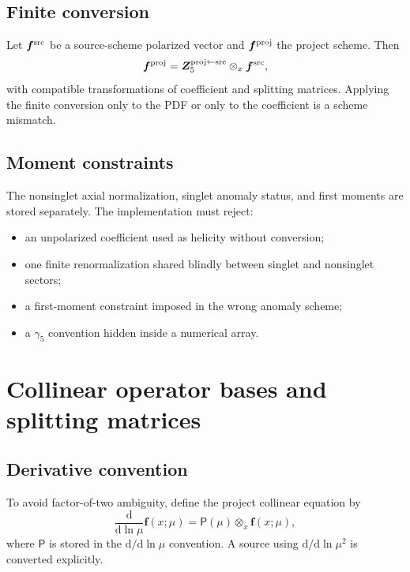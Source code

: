 \documentclass[11pt]{article}
\newcommand{\dd}{\mathrm{d}}
\newcommand{\otimesx}{\mathbin{\otimes_x}}
\begin{document}
\subsection{Finite conversion}

Let \(\bm f^{\rm src}\) be a source-scheme polarized vector and \(\bm f^{\rm proj}\) the project scheme.  Then
\begin{equation}
 \bm f^{\rm proj}
 =
 \bm Z_5^{\rm proj\leftarrow src}
 \otimesx
 \bm f^{\rm src},
 \label{eq:gamma5-conversion}
\end{equation}
with compatible transformations of coefficient and splitting matrices.  Applying the finite conversion only to the PDF or only to the coefficient is a scheme mismatch.

\subsection{Moment constraints}

The nonsinglet axial normalization, singlet anomaly status, and first moments are stored separately.  The implementation must reject:
\begin{itemize}
\item an unpolarized coefficient used as helicity without conversion;
\item one finite renormalization shared blindly between singlet and nonsinglet sectors;
\item a first-moment constraint imposed in the wrong anomaly scheme;
\item a \(\gamma_5\) convention hidden inside a numerical array.
\end{itemize}

\section{Collinear operator bases and splitting matrices}
\label{sec:collinear}

\subsection{Derivative convention}

To avoid factor-of-two ambiguity, define the project collinear equation by
\begin{equation}
 \frac{\dd}{\dd\ln\mu}
 \bm f(x;\mu)
 =
 \bm{\mathsf P}(\mu)\otimesx\bm f(x;\mu),
 \label{eq:project-dglap}
\end{equation}
where \(\bm{\mathsf P}\) is stored in the \(\dd/\dd\ln\mu\) convention.  A source using \(\dd/\dd\ln\mu^2\) is converted explicitly.
\end{document}
